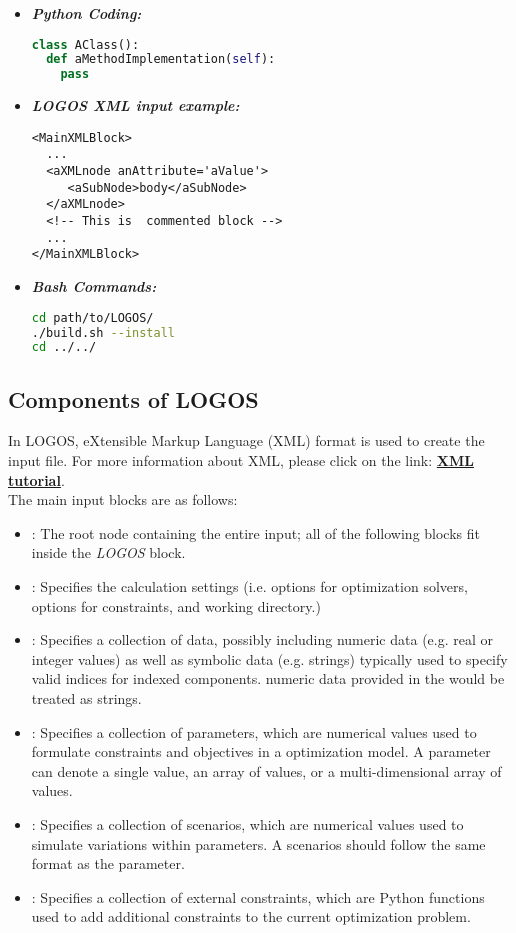 \begin{itemize}
\item \textbf{\textit{Python Coding:}}
\begin{lstlisting}[language=python]
class AClass():
  def aMethodImplementation(self):
    pass
\end{lstlisting}
\item \textbf{\textit{LOGOS XML input example:}}
\begin{lstlisting}[style=XML,morekeywords={anAttribute}]
<MainXMLBlock>
  ...
  <aXMLnode anAttribute='aValue'>
     <aSubNode>body</aSubNode>
  </aXMLnode>
  <!-- This is  commented block -->
  ...
</MainXMLBlock>
\end{lstlisting}
\item \textbf{\textit{Bash Commands:}}
\begin{lstlisting}[language=bash]
cd path/to/LOGOS/
./build.sh --install
cd ../../
\end{lstlisting}
\end{itemize}

\subsection{Components of LOGOS}
In LOGOS, eXtensible Markup Language (XML) format is used to create the input file. For more
information about XML, please click on the link:
\href{https://www.w3schools.com/xml/default.asp}{\textbf{XML tutorial}}.
%
\\The main input blocks are as follows:
\begin{itemize}
  \item {}: The root node containing the
  entire input; all of
  the following blocks fit inside the \emph{LOGOS} block.
  \item {}: Specifies the calculation settings (i.e. options for
	optimization solvers, options for constraints, and working directory.)
  \item {}: Specifies a collection of data, possibly including
	numeric data (e.g. real or integer values) as well as symbolic data (e.g. strings)
	typically used to specify valid indices for indexed components.
	\nb numeric data provided in the  would be treated as strings.
	\item {}: Specifies a collection of parameters, which are
  numerical values used to formulate constraints and objectives in a
	optimization model. A parameter can denote a single value, an array of values, or a multi-dimensional
	array of values.
	\item {}: Specifies a collection of scenarios, which are
	numerical values used to simulate variations within parameters. A scenarios should follow
	the same format as the parameter.
	\item {}: Specifies a collection of external constraints, which are
  Python functions used to add additional constraints to the
	current optimization problem.
\end{itemize}


